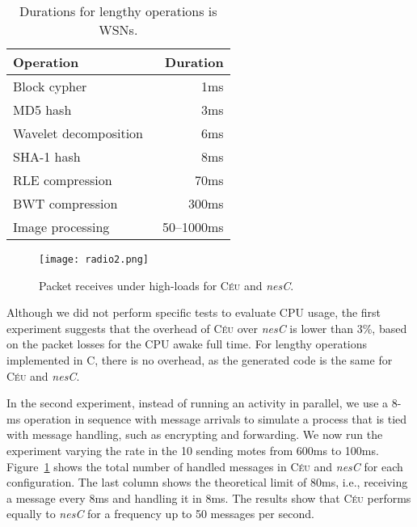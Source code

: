 \documentclass[10pt]{sensys-proc}
\newcommand{\CEU}{\textsc{C\'{e}u}\xspace}
\begin{document}
\begin{table}[t]
\begin{center}
\begin{tabular}{ | l | r | }
\hline
    Operation          & Duration  \\ \hline
\hline
    Block cypher~\cite{wsn.tinysec,wsn.crypto}  & 1ms           \\ \hline
    MD5 hash~\cite{wsn.crypto}                  & 3ms           \\ \hline
    Wavelet decomposition~\cite{wsn.wavelet}    & 6ms           \\ \hline
    SHA-1 hash~\cite{wsn.crypto}                & 8ms           \\ \hline
\hline
    RLE compression~\cite{wsn.compression}      & 70ms          \\ \hline
    BWT compression~\cite{wsn.compression}      & 300ms         \\ \hline
    Image processing~\cite{wsn.cyclops}         & 50--1000ms    \\ \hline
\end{tabular}
\caption{Durations for lengthy operations is WSNs.}
\label{tab.durs}
\end{center}
\end{table}

\begin{figure}[t]
\texttt{[image: radio2.png]}
\caption{ Packet receives under high-loads for \CEU and \emph{nesC}.
\label{fig.radio2}
}
\end{figure}

Although we did not perform specific tests to evaluate CPU usage, the first 
experiment suggests that the overhead of \CEU over \emph{nesC} is lower than 
3\%, based on the packet losses for the CPU awake full time.
For lengthy operations implemented in C, there is no overhead, as the generated 
code is the same for \CEU and \emph{nesC}.

In the second experiment, instead of running an activity in parallel, we use a 
8-ms operation in sequence with message arrivals to simulate a process that is 
tied with message handling, such as encrypting and forwarding.
We now run the experiment varying the rate in the 10 sending motes from 600ms 
to 100ms.
%
Figure~\ref{fig.radio2} shows the total number of handled messages in \CEU and 
\emph{nesC} for each configuration.
%
The last column shows the theoretical limit of 80ms, i.e., receiving a message 
every 8ms and handling it in 8ms.
%
The results show that \CEU performs equally to \emph{nesC} for a frequency up 
to 50 messages per second.
\end{document}
